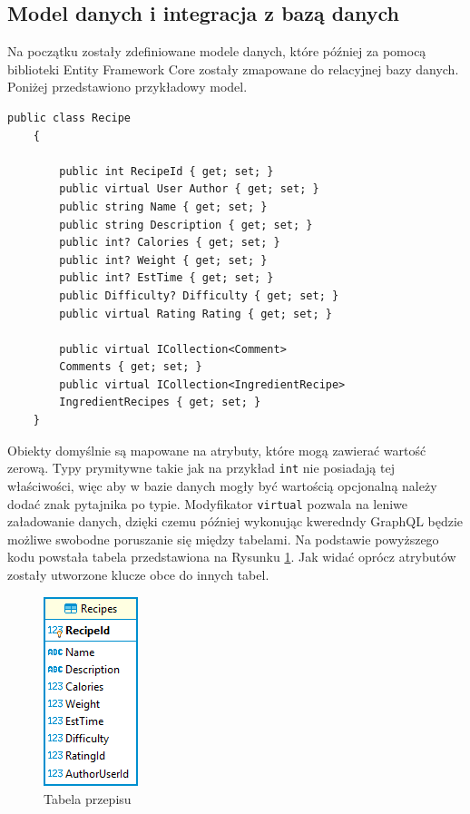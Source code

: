 \subsection{Model danych i integracja z bazą danych}
Na początku zostały zdefiniowane modele danych, które później za pomocą biblioteki Entity Framework Core zostały zmapowane do relacyjnej bazy danych. Poniżej przedstawiono przykładowy model.
\begin{lstlisting}[language={[Sharp]C}]
 public class Recipe
    {
        
        public int RecipeId { get; set; }
        public virtual User Author { get; set; }
        public string Name { get; set; }
        public string Description { get; set; }
        public int? Calories { get; set; }
        public int? Weight { get; set; }
        public int? EstTime { get; set; }
        public Difficulty? Difficulty { get; set; }
        public virtual Rating Rating { get; set; }
        
        public virtual ICollection<Comment>
        Comments { get; set; }
        public virtual ICollection<IngredientRecipe>
        IngredientRecipes { get; set; }
    }
\end{lstlisting}
Obiekty domyślnie są mapowane na atrybuty, które mogą zawierać wartość zerową. Typy prymitywne takie jak na przykład \texttt{int} nie posiadają tej właściwości, więc aby w bazie danych mogły być wartością opcjonalną należy dodać znak pytajnika po typie. Modyfikator \texttt{virtual} pozwala na leniwe załadowanie danych, dzięki czemu później wykonując kweredndy GraphQL będzie możliwe swobodne poruszanie się między tabelami. Na podstawie powyższego kodu powstała tabela przedstawiona na Rysunku \ref{fig:recipe_table}. Jak widać oprócz atrybutów zostały utworzone klucze obce do innych tabel.

\begin{figure}[H]
\centering
\includegraphics[width=.2\textwidth]{rys/recipe.png}
\caption{Tabela przepisu}
\label{fig:recipe_table}
\end{figure}

